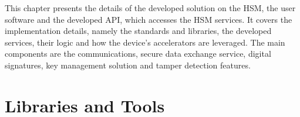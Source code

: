 \cleardoublepage
\label{chap:implementation}

This chapter presents the details of the developed solution on the HSM, the user software and the developed API, which accesses the HSM services.
It covers the implementation details, namely the standards and libraries, the developed services, their logic and how the device's accelerators are leveraged. The main components are the communications, secure data exchange service, digital signatures, key management solution and tamper detection features.

\section{Libraries and Tools}\label{chap:implementation:tools}

